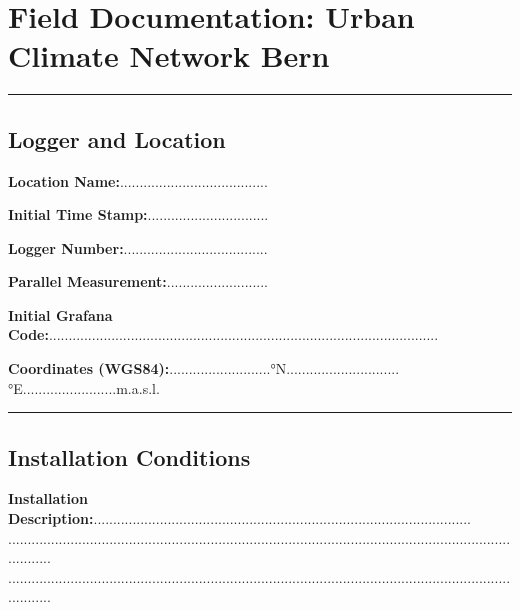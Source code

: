 
\section*{Field Documentation: Urban Climate Network Bern}
\vspace{-5mm}
\rule{\linewidth}{0.1mm}

\vspace{-5mm}
\subsection*{Logger and Location}

\begin{multicols}{2}
\textbf{Location Name:}......................................\hfill \newline

\vspace{-3mm}
\textbf{Initial Time Stamp:}............................... \hfill \newline

\textbf{Logger Number:}.....................................\hfill \newline

\vspace{-3mm}
\textbf{Parallel Measurement:}..........................\hfill \newline
\end{multicols}

\vspace{-7mm}
\textbf{Initial Grafana Code:}....................................................................................................\hfill \newline

\vspace{-3mm}
\textbf{Coordinates (WGS84):}..........................°N.............................°E........................m.a.s.l.

\rule{\linewidth}{0.1mm}


\vspace{-5mm}
\subsection*{Installation Conditions}
\textbf{Installation Description:}.................................................................................................\\
............................................................................................................................................\\
............................................................................................................................................\hfill \newline

